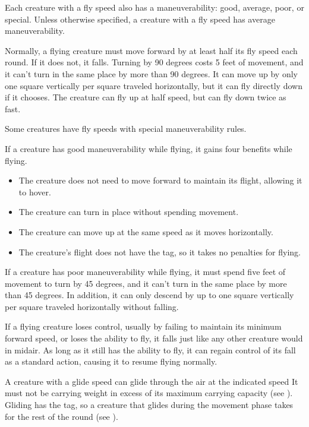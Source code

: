         Each creature with a fly speed also has a maneuverability: good, average, poor, or special.
        Unless otherwise specified, a creature with a fly speed has average maneuverability.

        Normally, a flying creature must move forward by at least half its fly speed each round. If it does not, it falls.
        Turning by 90 degrees costs 5 feet of movement, and it can't turn in the same place by more than 90 degrees.
        It can move up by only one square vertically per square traveled horizontally, but it can fly directly down if it chooses.
        The creature can fly up at half speed, but can fly down twice as fast.

        \label{Maneuverability} Some creatures have fly speeds with special maneuverability rules.

         If a creature has good maneuverability while flying, it gains four benefits while flying.
        \begin{itemize}
            \item The creature does not need to move forward to maintain its flight, allowing it to hover.
            \item The creature can turn in place without spending movement.
            \item The creature can move up at the same speed as it moves horizontally.
            \item The creature's flight does not have the  tag, so it takes no penalties for flying.
        \end{itemize}

         If a creature has poor maneuverability while flying, it must spend five feet of movement to turn by 45 degrees, and it can't turn in the same place by more than 45 degrees. In addition, it can only descend by up to one square vertically per square traveled horizontally without falling.

         If a flying creature loses control, usually by failing to maintain its minimum forward speed, or loses the ability to fly, it falls just like any other creature would in midair. As long as it still has the ability to fly, it can regain control of its fall as a standard action, causing it to resume flying normally.

        \label{Gliding}
        A creature with a glide speed can glide through the air at the indicated speed
        It must not be carrying weight in excess of its maximum carrying capacity (see ).
        Gliding has the  tag, so a creature that glides during the movement phase takes  for the rest of the round (see ).

